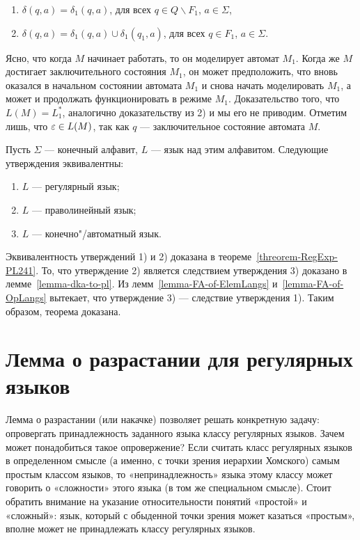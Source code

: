 \begin{myproof}
\begin{enumerate}
\begin{enumerate}[label=(\emph{\roman*})]
\item $\delta(q,a)=\delta_1(q,a)$, для всех $q\in Q\backslash F_1$, $a\in\Sigma$,

\item $\delta(q,a)=\delta_1(q,a)\cup\delta_1(q_1,a)$, для всех $q\in F_1$, $a\in\Sigma$.
\end{enumerate}

Ясно, что когда $M$ начинает работать, то он моделирует автомат $M_1$. Когда же $M$ достигает заключительного состояния $M_1$, он может предположить, что вновь оказался в начальном состоянии автомата $M_1$ и снова начать моделировать $M_1$, а может и продолжать функционировать в режиме $M_1$. Доказательство того, что $L(M)=L_1^*$, аналогично доказательству из 2) и мы его не приводим. Отметим лишь, что $\varepsilon\in L(M)$, так как $q$ --- заключительное состояние автомата $M$.
\end{enumerate}
\end{myproof}

\begin{mytheorem}
\label{theorem-Kleene}
Пусть $\Sigma$ --- конечный алфавит, $L$ --- язык над этим алфавитом. Следующие утверждения эквивалентны:
\begin{enumerate}
\item $L$ --- регулярный язык;

\item $L$ --- праволинейный язык;

\item $L$ --- конечно"/автоматный язык.
\end{enumerate}
\end{mytheorem}
\begin{myproof}
Эквивалентность утверждений 1) и 2) доказана в теореме~\ref{threorem-RegExp-PL241}. То, что утверждение 2) является следствием утверждения 3) доказано в лемме~\ref{lemma-dka-to-pl}. Из лемм~\ref{lemma-FA-of-ElemLangs} и~\ref{lemma-FA-of-OpLangs} вытекает, что утверждение 3) --- следствие утверждения 1). Таким образом, теорема доказана.
\end{myproof}

\section{Лемма о разрастании для регулярных языков}
\label{Chapter3Pumplemma}
Лемма о разрастании (или накачке) позволяет решать конкретную задачу: опровергать принадлежность заданного языка классу регулярных языков. Зачем может понадобиться такое опровержение? Если считать класс регулярных языков в определенном смысле (а именно, с точки зрения иерархии Хомского) самым простым классом языков, то «непринадлежность» языка этому классу может говорить о «сложности» этого языка (в том же специальном смысле). Стоит обратить внимание на указание относительности понятий «простой» и «сложный»: язык, который с обыденной точки зрения может
казаться «простым», вполне может не принадлежать классу регулярных языков.

